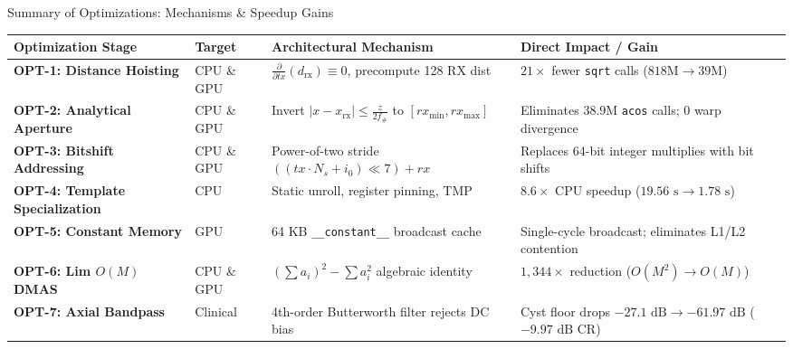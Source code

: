 \documentclass[aspectratio=169,10pt]{beamer}
\begin{document}
\begin{frame}{Summary of Optimizations: Mechanisms \& Speedup Gains}
  \begin{table}
    \centering
    \tiny
    \begin{tabular}{@{}llll@{}}
      \toprule
      Optimization Stage & Target & Architectural Mechanism & Direct Impact / Gain \\
      \midrule
      \textbf{OPT-1: Distance Hoisting} & CPU \& GPU & $\frac{\partial}{\partial tx}(d_{\text{rx}}) \equiv 0$, precompute 128 RX dist & $21\times$ fewer \texttt{sqrt} calls ($818\text{M} \to 39\text{M}$) \\
      \textbf{OPT-2: Analytical Aperture} & CPU \& GPU & Invert $|x - x_{\text{rx}}| \le \frac{z}{2f_{\#}}$ to $[rx_{\min}, rx_{\max}]$ & Eliminates $38.9\text{M}$ \texttt{acos} calls; 0 warp divergence \\
      \textbf{OPT-3: Bitshift Addressing} & CPU \& GPU & Power-of-two stride $((tx \cdot N_s + i_0) \ll 7) + rx$ & Replaces 64-bit integer multiplies with bit shifts \\
      \textbf{OPT-4: Template Specialization} & CPU & Static unroll, register pinning, TMP & $8.6\times$ CPU speedup ($19.56\text{ s} \to 1.78\text{ s}$) \\
      \textbf{OPT-5: Constant Memory} & GPU & 64 KB \texttt{\_\_constant\_\_} broadcast cache & Single-cycle broadcast; eliminates L1/L2 contention \\
      \textbf{OPT-6: Lim $O(M)$ DMAS} & CPU \& GPU & $(\sum a_i)^2 - \sum a_i^2$ algebraic identity & $1,344\times$ reduction ($O(M^2) \to O(M)$) \\
      \textbf{OPT-7: Axial Bandpass} & Clinical & 4th-order Butterworth filter rejects DC bias & Cyst floor drops $-27.1\text{ dB} \to -61.97\text{ dB}$ ($-9.97\text{ dB}$ CR) \\
      \bottomrule
    \end{tabular}
  \end{table}


\end{frame}
\end{document}

